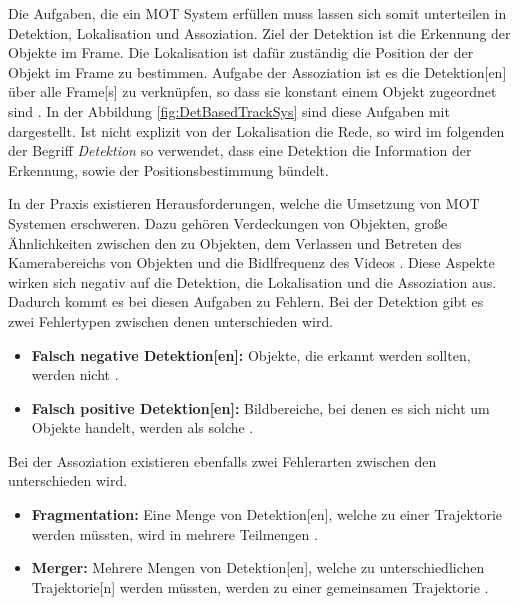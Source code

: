 Die Aufgaben, die ein \acrshort{MOT} System erfüllen muss lassen sich somit unterteilen in \gls{Detektion}, \gls{Lokalisation} und \gls{Assoziation}. Ziel der \gls{Detektion} ist die Erkennung der Objekte im \gls{Frame}. Die \gls{Lokalisation} ist dafür zuständig die Position der der Objekt im \gls{Frame} zu bestimmen. Aufgabe der \gls{Assoziation} ist es die \gls{Detektion}[en] über alle \gls{Frame}[s] zu verknüpfen, so dass sie konstant einem Objekt zugeordnet sind \cite{CLEAR.2008, HOTA}. In der Abbildung \ref{fig:DetBasedTrackSys} sind diese Aufgaben mit dargestellt. Ist nicht explizit von der \gls{Lokalisation} die Rede, so wird im folgenden der Begriff \textit{\gls{Detektion}} so verwendet, dass eine \gls{Detektion} die Information der Erkennung, sowie der Positionsbestimmung bündelt. \par

In der Praxis existieren Herausforderungen, welche die Umsetzung von \acrshort{MOT} Systemen erschweren. Dazu gehören Verdeckungen von Objekten, große Ähnlichkeiten zwischen den zu  Objekten, dem Verlassen und Betreten des Kamerabereichs von Objekten und die Bidlfrequenz des Videos \cite{EMPTYCITE}.   Diese Aspekte wirken sich negativ auf die \gls{Detektion}, die \gls{Lokalisation} und die \gls{Assoziation} aus. Dadurch kommt es bei diesen Aufgaben zu Fehlern. Bei der \gls{Detektion} gibt es zwei Fehlertypen zwischen denen unterschieden wird. 

\begin{itemize}
    \item \textbf{Falsch negative \gls{Detektion}[en]:} Objekte, die erkannt werden sollten, werden nicht .
    \item \textbf{Falsch positive \gls{Detektion}[en]:} Bildbereiche, bei denen es sich nicht um Objekte handelt, werden als solche .
\end{itemize}

Bei der \gls{Assoziation} existieren ebenfalls zwei Fehlerarten zwischen den unterschieden wird.

\begin{itemize}
    \item \textbf{Fragmentation:} Eine Menge von \gls{Detektion}[en], welche zu einer \gls{Trajektorie}  werden müssten, wird in mehrere Teilmengen .
    \item \textbf{Merger:} Mehrere Mengen von \gls{Detektion}[en], welche zu unterschiedlichen \gls{Trajektorie}[n]  werden müssten, werden zu einer gemeinsamen \gls{Trajektorie} .
\end{itemize}

